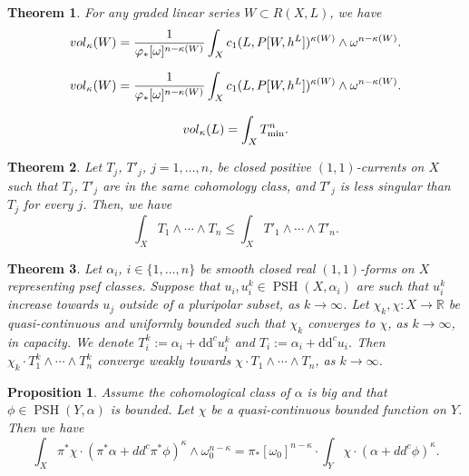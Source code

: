 \documentclass[10pt,a4paper]{amsart}
\newtheorem{thm}{Theorem}
\newtheorem{prop}{Proposition}
\newcommand{\ddc}{\mathrm{d} \mathrm{d}^c}
\newcommand{\psh}{\operatorname{PSH}}
\newcommand{\real}{\mathbb{R}}
\begin{document}
	\begin{thm}\label{thm_vol_form}
		For any graded linear series $W \subset R(X, L)$, we have
		\begin{equation}\label{eq_vol_form}
			{\rm{vol}}_{\kappa}(W)
			=
			\frac{1}{\varphi_{*} [\omega]^{n - \kappa(W)}} \int_X c_1(L, P[W, h^L])^{\kappa(W)} \wedge \omega^{n - \kappa(W)}.
		\end{equation}
	\end{thm}

		\begin{equation}
			{\rm{vol}}_{\kappa}(W)
			=
			\frac{1}{\varphi_{*} [\omega]^{n - \kappa(W)}} \int_X c_1(L, P[W, h^L])^{\kappa(W)} \wedge \omega^{n - \kappa(W)}.
		\end{equation}

		\begin{equation}\label{eq_vol_bouck}
			{\rm{vol}}_{\kappa}(L) = \int_X T_{\min}^n.
		\end{equation}

	\begin{thm}\label{thm_wn_monot}
		Let $T_j$, $T'_j$, $j = 1, \ldots, n$, be closed positive $(1, 1)$-currents on $X$ such that $T_j$, $T'_j$ are in the same cohomology class, and $T'_j$ is less singular than $T_j$ for every $j$. 
		Then, we have
		\begin{equation}
			\int_X T_1 \wedge \cdots \wedge T_n \leq \int_X T'_1 \wedge \cdots \wedge T'_n.
		\end{equation}
	\end{thm}

	\begin{thm}\label{thm_cont_begz}
		Let $\alpha_i$, $i \in \{1, \ldots, n\}$ be smooth closed real $(1, 1)$-forms on $X$ representing psef classes. 
		Suppose that $u_i, u_i^k \in \psh(X, \alpha_i)$ are such that $u_i^k$ increase towards $u_j$ outside of a pluripolar subset, as $k \to \infty$.
		Let $\chi_k, \chi : X \to \real$ be quasi-continuous and uniformly bounded such that $\chi_k$ converges to $\chi$, as $k \to \infty$, in capacity.
		We denote $T_i^k := \alpha_i + \ddc u_i^k$ and $T_i := \alpha_i + \ddc u_i$.
		Then $\chi_k \cdot T_1^k \wedge \cdots \wedge T_n^k$ converge weakly towards $\chi \cdot T_1 \wedge \cdots \wedge T_n$, as $k \to \infty$.
	\end{thm}

	\begin{prop}\label{prop_proj_fla}
		Assume the cohomological class of $\alpha$ is big and that $\phi \in \psh(Y, \alpha)$ is bounded.
		Let $\chi$ be a quasi-continuous bounded function on $Y$.
		Then we have
		\begin{equation}
			\int_X \pi^* \chi \cdot (\pi^* \alpha + dd^c \pi^* \phi)^{\kappa} \wedge \omega_0^{n - \kappa}
			=
			\pi_*[\omega_0]^{n - \kappa}
			\cdot
			\int_Y \chi \cdot (\alpha + dd^c \phi)^{\kappa}.
		\end{equation}
	\end{prop}
\end{document}
